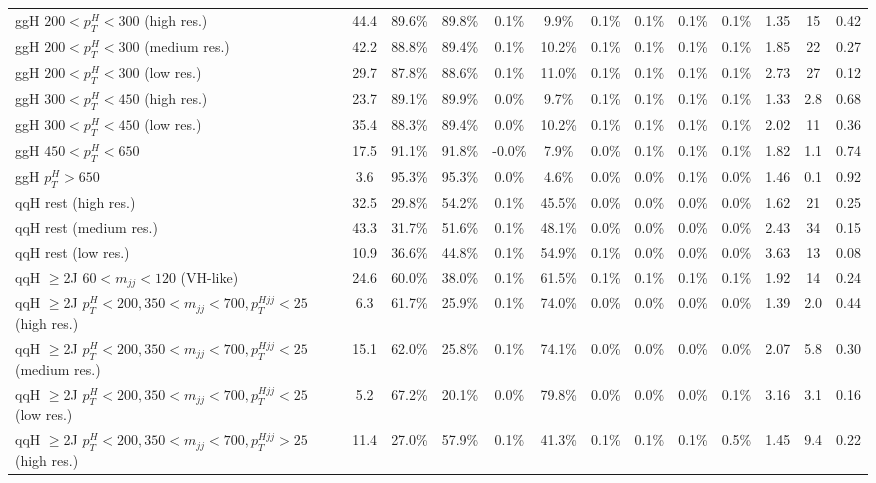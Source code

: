 \begin{table}
\begin{tabular}{lcccccccccccc}
ggH $200 < p_{T}^{H} < 300$ (high res.) & 44.4 & 89.6\% & 89.8\% & 0.1\% & 9.9\% & 0.1\% & 0.1\% & 0.1\% & 0.1\% & 1.35 & 15 & 0.42 \\
ggH $200 < p_{T}^{H} < 300$ (medium res.) & 42.2 & 88.8\% & 89.4\% & 0.1\% & 10.2\% & 0.1\% & 0.1\% & 0.1\% & 0.1\% & 1.85 & 22 & 0.27 \\
ggH $200 < p_{T}^{H} < 300$ (low res.) & 29.7 & 87.8\% & 88.6\% & 0.1\% & 11.0\% & 0.1\% & 0.1\% & 0.1\% & 0.1\% & 2.73 & 27 & 0.12 \\
ggH $300 < p_{T}^{H} < 450$ (high res.) & 23.7 & 89.1\% & 89.9\% & 0.0\% & 9.7\% & 0.1\% & 0.1\% & 0.1\% & 0.1\% & 1.33 & 2.8 & 0.68 \\
ggH $300 < p_{T}^{H} < 450$ (low res.) & 35.4 & 88.3\% & 89.4\% & 0.0\% & 10.2\% & 0.1\% & 0.1\% & 0.1\% & 0.1\% & 2.02 & 11 & 0.36 \\
ggH $450 < p_{T}^{H} < 650$ & 17.5 & 91.1\% & 91.8\% & -0.0\% & 7.9\% & 0.0\% & 0.1\% & 0.1\% & 0.1\% & 1.82 & 1.1 & 0.74 \\
ggH $p_{T}^{H} > 650$ & 3.6 & 95.3\% & 95.3\% & 0.0\% & 4.6\% & 0.0\% & 0.0\% & 0.1\% & 0.0\% & 1.46 & 0.1 & 0.92 \\
qqH rest (high res.) & 32.5 & 29.8\% & 54.2\% & 0.1\% & 45.5\% & 0.0\% & 0.0\% & 0.0\% & 0.0\% & 1.62 & 21 & 0.25 \\
qqH rest (medium res.) & 43.3 & 31.7\% & 51.6\% & 0.1\% & 48.1\% & 0.0\% & 0.0\% & 0.0\% & 0.0\% & 2.43 & 34 & 0.15 \\
qqH rest (low res.) & 10.9 & 36.6\% & 44.8\% & 0.1\% & 54.9\% & 0.1\% & 0.0\% & 0.0\% & 0.0\% & 3.63 & 13 & 0.08 \\
qqH $\geq$2J $60 < m_{jj} < 120$ (VH-like) & 24.6 & 60.0\% & 38.0\% & 0.1\% & 61.5\% & 0.1\% & 0.1\% & 0.1\% & 0.1\% & 1.92 & 14 & 0.24 \\
qqH $\geq$2J $p_{T}^{H} < 200, 350 < m_{jj} < 700, p_{T}^{Hjj} < 25$ (high res.) & 6.3 & 61.7\% & 25.9\% & 0.1\% & 74.0\% & 0.0\% & 0.0\% & 0.0\% & 0.0\% & 1.39 & 2.0 & 0.44 \\
qqH $\geq$2J $p_{T}^{H} < 200, 350 < m_{jj} < 700, p_{T}^{Hjj} < 25$ (medium res.) & 15.1 & 62.0\% & 25.8\% & 0.1\% & 74.1\% & 0.0\% & 0.0\% & 0.0\% & 0.0\% & 2.07 & 5.8 & 0.30 \\
qqH $\geq$2J $p_{T}^{H} < 200, 350 < m_{jj} < 700, p_{T}^{Hjj} < 25$ (low res.) & 5.2 & 67.2\% & 20.1\% & 0.0\% & 79.8\% & 0.0\% & 0.0\% & 0.0\% & 0.1\% & 3.16 & 3.1 & 0.16 \\
qqH $\geq$2J $p_{T}^{H} < 200, 350 < m_{jj} < 700, p_{T}^{Hjj} > 25$ (high res.) & 11.4 & 27.0\% & 57.9\% & 0.1\% & 41.3\% & 0.1\% & 0.1\% & 0.1\% & 0.5\% & 1.45 & 9.4 & 0.22 \\

\end{tabular}
\end{table}
